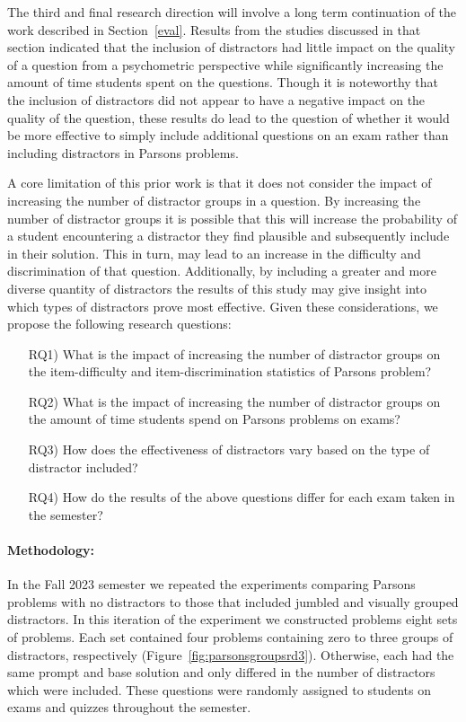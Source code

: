 \documentclass[authorversion,nonacm]{acmart}
\begin{document}
The third and final research direction will involve a long term continuation of
the work described in Section~\ref{eval}. Results from the studies discussed in
that section indicated that the inclusion of distractors had little impact on
the quality of a question from a psychometric perspective while significantly
increasing the amount of time students spent on the questions. Though it is
noteworthy that the inclusion of distractors did not appear to have a negative
impact on the quality of the question, these results do lead to the question of
whether it would be more effective to simply include additional questions on an
exam rather than including distractors in Parsons problems.

A core limitation of this prior work is that it does not consider the impact of
increasing the number of distractor groups in a question. By increasing the 
number of distractor groups it is possible that this will increase the probability
of a student encountering a distractor they find plausible and subsequently
include in their solution. This in turn, may lead to an increase in the
difficulty and discrimination of that question. Additionally, by including 
a greater and more diverse quantity of distractors the results of this study
may give insight into which types of distractors prove most effective. Given
these considerations, we propose the following research questions:
\begin{enumerate}
  \item[RQ1) ] What is the impact of increasing the number of distractor groups on the item-difficulty and item-discrimination statistics of Parsons problem?
  \item[RQ2) ] What is the impact of increasing the number of distractor groups on the amount of time students spend on Parsons problems on exams?
  \item[RQ3) ] How does the effectiveness of distractors vary based on the type of distractor included?
  \item[RQ4) ] How do the results of the above questions differ for each exam taken in the semester?
\end{enumerate}


\paragraph{Methodology:} 

In the Fall 2023 semester we repeated the experiments comparing Parsons
problems with no distractors to those that included jumbled and visually
grouped distractors. In this iteration of the experiment we constructed
problems eight sets of problems. Each set contained four problems containing
zero to three groups of distractors, respectively
(Figure~\ref{fig:parsonsgroupsrd3}). Otherwise, each had the same prompt and
base solution and only differed in the number of distractors which were
included. These questions were randomly assigned to students on exams and
quizzes throughout the semester. 
\end{document}
